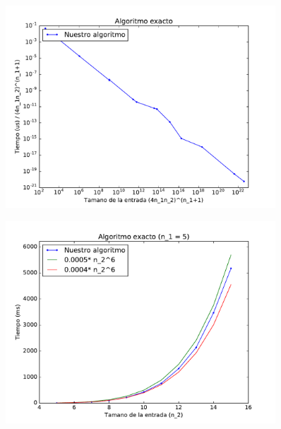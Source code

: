\begin{figure}[H]
 \centering
	\includegraphics[width=0.9\textwidth]{graficos/problema_2/tiempos_1.pdf}
	\caption{}
	\label{fig:problema2-1}
\end{figure}


\begin{figure}[H]
 \centering
	\includegraphics[width=0.9\textwidth]{graficos/problema_2/tiempos_2.pdf}
	\caption{}
	\label{fig:problema2-2}
\end{figure}
